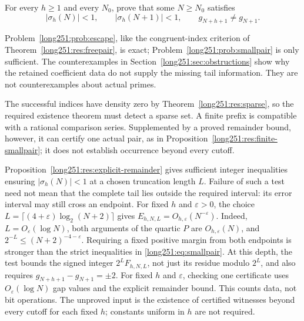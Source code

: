 \documentclass[11pt]{article}
\begin{document}
\begin{problem}\label{long251:prob:smallpair}
For every $h\ge1$ and every $N_0$, prove that some $N\ge N_0$ satisfies
\begin{equation}
 \bigl|\sigma_h(N)\bigr|<1,\qquad
 \bigl|\sigma_h(N+1)\bigr|<1,\qquad
 g_{N+h+1}\ne g_{N+1} .
\label{long251:eq:smallpair}
\end{equation}
\end{problem}

Problem~\ref{long251:prob:escape}, like the congruent-index criterion of
Theorem~\ref{long251:res:freepair}, is exact;
Problem~\ref{long251:prob:smallpair} is only sufficient.
The counterexamples in Section~\ref{long251:sec:obstructions} show why
the retained coefficient data do not supply the missing tail information.
They are not counterexamples about actual primes.

The successful indices have density zero by
Theorem~\ref{long251:res:sparse}, so the required existence theorem
must detect a sparse set.  A finite prefix is compatible with a rational
comparison series.  Supplemented by a proved remainder bound, however,
it can certify one actual pair, as in
Proposition~\ref{long251:res:finite-smallpair}; it does not establish
occurrence beyond every cutoff.

Proposition~\ref{long251:res:explicit-remainder} gives sufficient integer
inequalities ensuring $|\sigma_h(N)|<1$ at a chosen truncation length $L$.
Failure of such a test need not mean that the complete tail lies outside
the required interval: its error interval may still cross an endpoint.
For fixed $h$ and $\varepsilon>0$, the choice
$L=\lceil(4+\varepsilon)\log_2(N+2)\rceil$ gives
$E_{h,N,L}=O_{h,\varepsilon}(N^{-\varepsilon})$.
Indeed, $L=O_\varepsilon(\log N)$, both arguments of the quartic $P$ are
$O_{h,\varepsilon}(N)$, and $2^{-L}\le(N+2)^{-4-\varepsilon}$.
Requiring a fixed positive margin from both endpoints is stronger than
the strict inequalities in \eqref{long251:eq:smallpair}.  At this depth,
the test bounds the signed integer $2^LF_{h,N,L}$, not just its residue
modulo $2^L$, and also requires $g_{N+h+1}-g_{N+1}=\pm2$.
For fixed $h$ and $\varepsilon$, checking one certificate uses
$O_\varepsilon(\log N)$ gap values and the explicit remainder bound.
This counts data, not bit operations.  The unproved input is the
existence of certified witnesses beyond every cutoff for each fixed $h$;
constants uniform in $h$ are not required.
\end{document}
